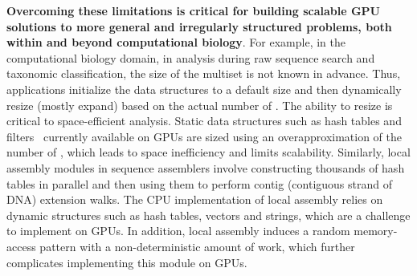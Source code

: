 \textbf{Overcoming these limitations is critical for building scalable GPU solutions to more general and irregularly structured problems, both within and beyond computational biology}. For example, in the computational biology domain, in \kmer analysis during raw sequence search and taxonomic classification, the size of the \kmer multiset is not known in advance. Thus, applications initialize the data structures to a default size and then dynamically resize (mostly expand) based on the actual number of \kmers. The ability to resize is critical to space-efficient \kmer analysis. Static data structures such as hash tables and filters~\cite{GeilFO18} currently available on GPUs are sized using an overapproximation of the number of \kmers, which leads to space inefficiency and limits scalability.
Similarly, local assembly modules in sequence assemblers involve constructing thousands of hash tables in parallel and then using them to perform contig (contiguous strand of DNA) extension walks. The CPU implementation of local assembly relies on dynamic structures such as hash tables, vectors and strings, which are a challenge to implement on GPUs. In addition, local assembly induces a random memory-access pattern with a non-deterministic amount of work, which further complicates implementing this module on GPUs.


